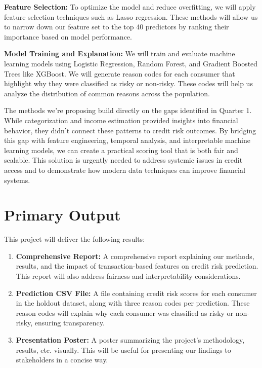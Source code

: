 \documentclass[12pt,letterpaper]{article}
\begin{document}
\textbf{Feature Selection:} To optimize the model and reduce overfitting, we will apply feature selection techniques such as Lasso regression. These methods will allow us to narrow down our feature set to the top 40 predictors by ranking their importance based on model performance.

\textbf{Model Training and Explanation:} We will train and evaluate machine learning models using Logistic Regression, Random Forest, and Gradient Boosted Trees like XGBoost. We will generate reason codes for each consumer that highlight why they were classified as risky or non-risky. These codes will help us analyze the distribution of common reasons across the population.

The methods we’re proposing build directly on the gaps identified in Quarter 1. While categorization and income estimation provided insights into financial behavior, they didn’t connect these patterns to credit risk outcomes. By bridging this gap with feature engineering, temporal analysis, and interpretable machine learning models, we can create a practical scoring tool that is both fair and scalable. This solution is urgently needed to address systemic issues in credit access and to demonstrate how modern data techniques can improve financial systems.


\section{Primary Output}
This project will deliver the following results:
\begin{enumerate}
    \item \textbf{Comprehensive Report:} A comprehensive report explaining our methods, results, and the impact of transaction-based features on credit risk prediction. This report will also address fairness and interpretability considerations.
    \item \textbf{Prediction CSV File:} A file containing credit risk scores for each consumer in the holdout dataset, along with three reason codes per prediction. These reason codes will explain why each consumer was classified as risky or non-risky, ensuring transparency.
    \item \textbf{Presentation Poster:} A poster summarizing the project’s methodology, results, etc. visually. This will be useful for presenting our findings to stakeholders in a concise way.
\end{enumerate}
\end{document}
